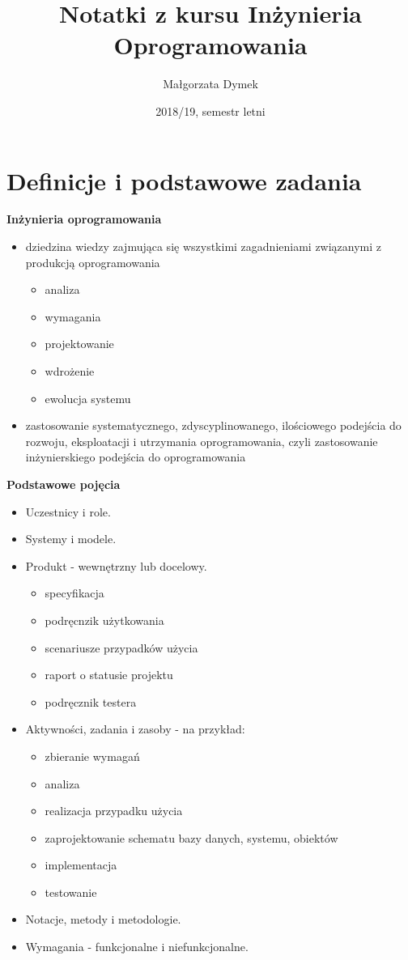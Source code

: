 \documentclass[a4paper]{article}
\title{Notatki z kursu Inżynieria Oprogramowania}
\author{Małgorzata Dymek}
\date{2018/19, semestr letni}
\begin{document}
\maketitle


\section{Definicje i podstawowe zadania}
\textbf{Inżynieria oprogramowania}
    \begin{itemize}
        \item dziedzina wiedzy zajmująca się wszystkimi zagadnieniami związanymi z produkcją oprogramowania
        \begin{itemize}
            \item analiza
            \item wymagania
            \item projektowanie
            \item wdrożenie
            \item ewolucja systemu
        \end{itemize}

        \item zastosowanie  systematycznego, zdyscyplinowanego, ilościowego podejścia do rozwoju, eksploatacji i utrzymania
        oprogramowania, czyli zastosowanie inżynierskiego podejścia do oprogramowania
    \end{itemize}

\textbf{Podstawowe pojęcia}
    \begin{itemize}
        \item Uczestnicy i role.
        \item Systemy i modele.
        \item Produkt - wewnętrzny lub docelowy.
        \begin{itemize}
            \item specyfikacja
            \item podręcnzik użytkowania
            \item scenariusze przypadków użycia
            \item raport o statusie projektu
            \item podręcznik testera
        \end{itemize}
        \item Aktywności, zadania i zasoby - na przykład:
        \begin{itemize}
            \item zbieranie wymagań
            \item analiza
            \item realizacja przypadku użycia
            \item zaprojektowanie schematu bazy danych, systemu, obiektów
            \item implementacja
            \item testowanie
        \end{itemize}
        \item Notacje, metody i metodologie.
        \item Wymagania - funkcjonalne i niefunkcjonalne.
    \end{itemize}
\end{document}
